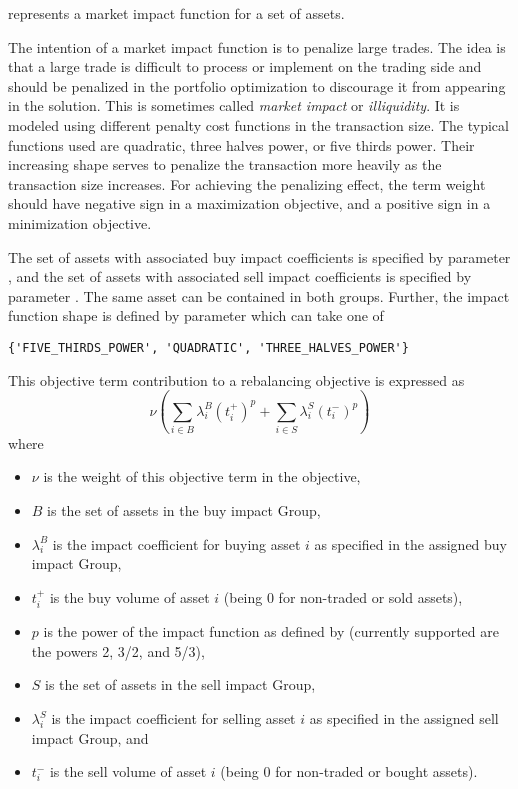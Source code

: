      represents a market impact function for a set of assets. 

     The intention of a market impact function is to penalize large trades. 
     The idea is that a large trade is difficult to process or implement on the trading side 
     and should be penalized in the portfolio optimization to discourage it from appearing in the solution. 
     This is sometimes called \emph{market impact} or \emph{illiquidity}. 
     It is modeled using different penalty cost functions in the transaction size. 
     The typical functions used are quadratic, three halves power, or five thirds power. 
     Their increasing shape serves to penalize the transaction more heavily as the transaction size increases.
     For achieving the penalizing effect, the term weight should have negative sign in a maximization objective, 
     and a positive sign in a minimization objective. 

     The set of assets with associated buy impact coefficients is specified by parameter ,
     and the set of assets with associated sell impact coefficients is specified by parameter .
     The same asset can be contained in both groups. 
     Further, the impact function shape is defined by parameter 
     which can take one of
\begin{lstlisting}[numbers=none]
   {'FIVE_THIRDS_POWER', 'QUADRATIC', 'THREE_HALVES_POWER'}
\end{lstlisting}

     This objective term contribution to a rebalancing objective is expressed as 
     \[
        \nu\left(\sum_{i\in B}\lambda_i^B(t_i^+)^p + \sum_{i\in S}\lambda_i^S(t_i^-)^p\right)
     \]
     where
     \begin{itemize}
		  \item $\nu$ is the weight of this objective term in the objective, 
        \item $B$ is the set of assets in the buy impact Group, 
        \item $\lambda_i^B$ is the impact coefficient for buying asset $i$ as specified in the assigned buy impact Group, 
        \item $t_i^+$ is the buy volume of asset $i$ (being 0 for non-traded or sold assets), 
        \item $p$ is the power of the impact function as defined by 
             (currently supported are the powers 2, 3/2, and 5/3), 
        \item $S$ is the set of assets in the sell impact Group, 
        \item $\lambda_i^S$ is the impact coefficient for selling asset $i$ as specified in the assigned sell impact Group, and 
        \item $t_i^-$ is the sell volume of asset $i$ (being 0 for non-traded or bought assets). 
     \end{itemize}

